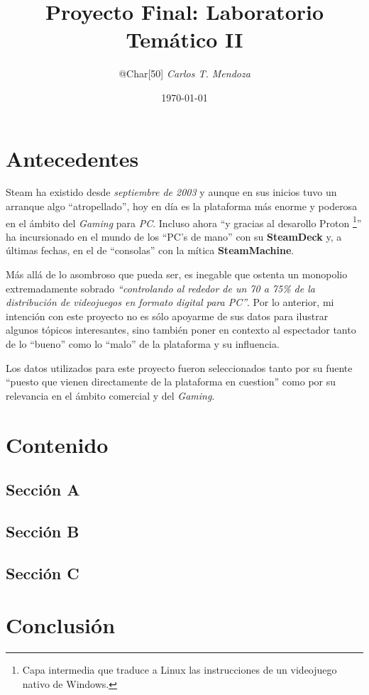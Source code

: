 \documentclass[letterpaper, 11pt]{article}
\title{Proyecto Final: Laboratorio Temático II}
\author{@Char[50] \textit{Carlos T. Mendoza}}
\date{\today}
\begin{document}
\maketitle
\tableofcontents

\newpage
\section{Antecedentes}
    Steam ha existido desde \textit{septiembre de 2003} y aunque en sus inicios tuvo un arranque algo \enquote{atropellado}, hoy en día es la plataforma más enorme y poderosa en el ámbito del \textit{Gaming} para \textit{PC}. Incluso ahora \enquote{y gracias al desarollo Proton \footnote{Capa intermedia que traduce a Linux las instrucciones de un videojuego nativo de Windows.}} ha incursionado en el mundo de los \enquote{PC's de mano} con su \textbf{SteamDeck} y, a últimas fechas, en el de \enquote{consolas} con la mítica \textbf{SteamMachine}. 

    Más allá de lo asombroso que pueda ser, es inegable que ostenta un monopolio extremadamente sobrado \textit{\enquote{controlando al rededor de un 70 a 75\% de la distribución de videojuegos en formato digital para PC}}. Por lo anterior, mi intención con este proyecto no es sólo apoyarme de sus datos para ilustrar algunos tópicos interesantes, sino también poner en contexto al espectador tanto de lo \enquote{bueno} como lo \enquote{malo} de la plataforma y su influencia. 

    Los datos utilizados para este proyecto fueron seleccionados tanto por su fuente \enquote{puesto que vienen directamente de la plataforma en cuestion} como por su relevancia en el ámbito comercial y del \textit{Gaming}. 


\section{Contenido}
    \subsection{Sección A} 

    \subsection{Sección B} 

    \subsection{Sección C} 
    

\newpage
\section{Conclusión}
\end{document}
